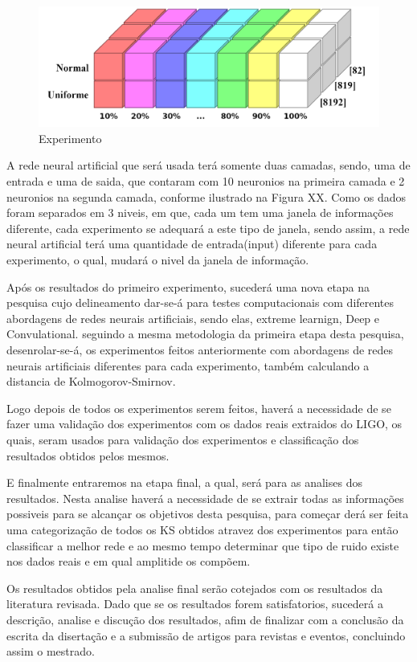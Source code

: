 \begin{figure}[ht]
\centering
\includegraphics[width=1\textwidth]{figuras/experimento.png}
\caption{Experimento}
\label{figexperimento}
\end{figure}

A rede neural artificial que será usada terá somente duas camadas, sendo, uma de entrada e uma de saida, que contaram com 10 neuronios na primeira camada e 2 neuronios na segunda camada, conforme ilustrado na Figura XX. Como os dados foram separados em 3 niveis, em que, cada um tem uma janela de informações diferente, cada experimento se adequará a este tipo de janela, sendo assim, a rede neural artificial terá uma quantidade de entrada(input) diferente para cada experimento, o qual, mudará o nivel da janela de informação.

Após os resultados do primeiro experimento, sucederá uma nova etapa na pesquisa cujo delineamento dar-se-á para testes computacionais com diferentes abordagens de redes neurais artificiais, sendo elas, extreme learnign, Deep e Convulational. seguindo a mesma metodologia da primeira etapa desta pesquisa, desenrolar-se-á, os experimentos feitos anteriormente com abordagens de redes neurais artificiais diferentes para cada experimento, também calculando a distancia de Kolmogorov-Smirnov.

Logo depois de todos os experimentos serem feitos, haverá a necessidade de se fazer uma validação dos experimentos com os dados reais extraidos do LIGO, os quais, seram usados para validação dos experimentos e classificação dos resultados obtidos pelos mesmos.

E finalmente entraremos na etapa final, a qual, será para as analises dos resultados. Nesta analise haverá a necessidade de  se extrair todas as informações possiveis para se alcançar os objetivos desta pesquisa, para começar derá ser feita uma categorização de todos os KS obtidos atravez dos experimentos para então classificar a melhor rede e ao mesmo tempo determinar que tipo de ruido existe nos dados reais e em qual amplitide os compõem.

Os resultados obtidos pela analise final serão cotejados com os resultados da literatura revisada. Dado que se os resultados forem satisfatorios, sucederá a descrição, analise e discução dos resultados, afim de finalizar com a conclusão da escrita da disertação e a submissão de artigos para revistas e eventos, concluindo assim o mestrado.